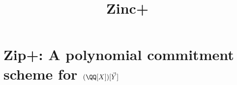 \documentclass[11pt]{article}
\title{Zinc+}
\begin{document}
\maketitle

\section{Zip+: A polynomial commitment scheme for $(\QQ[X])[\vec Y]$}

	
\end{document}

